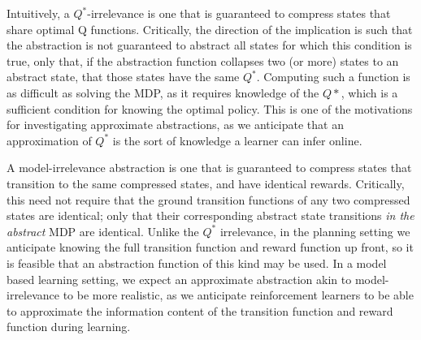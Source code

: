 Intuitively, a $Q^*$-irrelevance is one that is guaranteed to compress states that share optimal Q functions. Critically, the direction of the implication is such that the abstraction is not guaranteed to abstract all states for which this condition is true, only that, if the abstraction function collapses two (or more) states to an abstract state, that those states have the same $Q^*$. Computing such a function is as difficult as solving the MDP, as it requires knowledge of the $Q*$, which is a sufficient condition for knowing the optimal policy. This is one of the motivations for investigating approximate abstractions, as we anticipate that an approximation of $Q^*$ is the sort of knowledge a learner can infer online.

A model-irrelevance abstraction is one that is guaranteed to compress states that transition to the same compressed states, and have identical rewards. Critically, this need not require that the ground transition functions of any two compressed states are identical; only that their corresponding abstract state transitions {\it in the abstract} MDP are identical. Unlike the $Q^*$ irrelevance, in the planning setting we anticipate knowing the full transition function and reward function up front, so it is feasible that an abstraction function of this kind may be used. In a model based learning setting, we expect an approximate abstraction akin to model-irrelevance to be more realistic, as we anticipate reinforcement learners to be able to approximate the information content of the transition function and reward function during learning.











